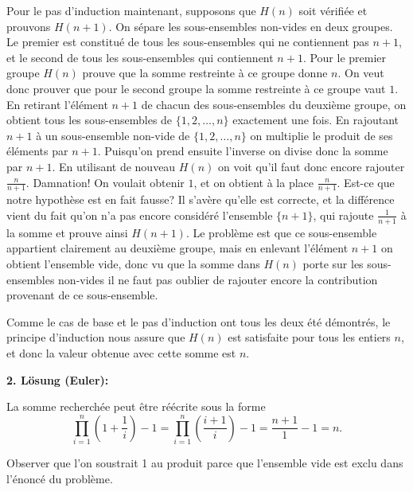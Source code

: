 \documentclass[language=german,style=solution]{smo}
\begin{document}
\begin{enumerate}
Pour le pas d'induction maintenant, supposons que $H(n)$ soit vérifiée et prouvons $H(n+1)$. On sépare les sous-ensembles non-vides en deux groupes. Le premier est constitué de tous les sous-ensembles qui ne contiennent pas $n+1$, et le second de tous les sous-ensembles qui contiennent $n+1$. Pour le premier groupe $H(n)$ prouve que la somme restreinte à ce groupe donne $n$. \newline
On veut donc prouver que pour le second groupe la somme restreinte à ce groupe vaut $1$. En retirant l'élément $n+1$ de chacun des sous-ensembles du deuxième groupe, on obtient tous les sous-ensembles de $\{1, 2, \ldots, n\}$ exactement une fois. En rajoutant $n+1$ à un sous-ensemble non-vide de $\{1, 2, \ldots, n\}$ on multiplie le produit de ses éléments par $n+1$. Puisqu'on prend ensuite l'inverse on divise donc la somme par $n+1$. En utilisant de nouveau $H(n)$ on voit qu'il faut donc encore rajouter $\frac{n}{n+1}$. Damnation! On voulait obtenir $1$, et on obtient à la place $\frac{n}{n+1}$. Est-ce que notre hypothèse est en fait fausse? Il s'avère qu'elle est correcte, et la différence vient du fait qu'on n'a pas encore considéré l'ensemble $\{n+1\}$, qui rajoute $\frac{1}{n+1}$ à la somme et prouve ainsi $H(n+1)$. Le problème est que ce sous-ensemble appartient clairement au deuxième groupe, mais en enlevant l'élément $n+1$ on obtient l'ensemble vide, donc vu que la somme dans $H(n)$ porte sur les sous-ensembles non-vides il ne faut pas oublier de rajouter encore la contribution provenant de ce sous-ensemble.

Comme le cas de base et le pas d'induction ont tous les deux été démontrés, le principe d'induction nous assure que $H(n)$ est satisfaite pour tous les entiers $n$, et donc la valeur obtenue avec cette somme est $n$.


\textbf{2. Lösung (Euler):}

La somme recherchée peut être réécrite sous la forme
\[
\prod_{i=1}^n\left(1+\frac{1}{i}\right)-1=\prod_{i=1}^n\left(\frac{i+1}{i}\right)-1=\frac{n+1}{1}-1=n.
\]

Observer que l'on soustrait 1 au produit parce que l'ensemble vide est exclu dans l'énoncé du problème.


\end{enumerate}
\end{document}
